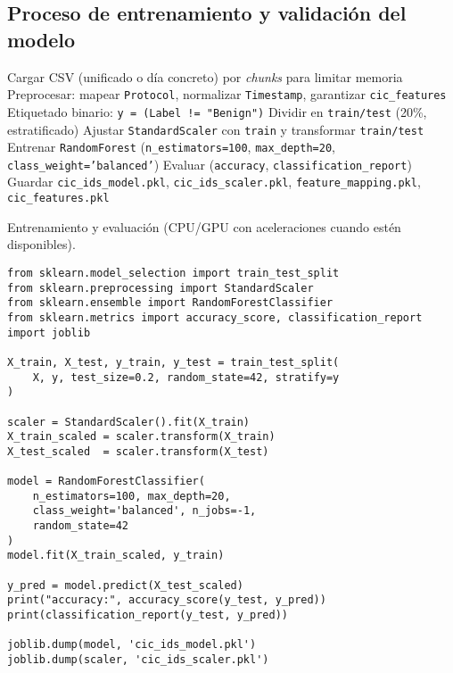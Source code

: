 \subsection{Proceso de entrenamiento y validación del modelo}
\begin{algorithm}[H]
\SetAlgoLined
{}
Cargar CSV (unificado o día concreto) por \textit{chunks} para limitar memoria\;
Preprocesar: mapear \texttt{Protocol}, normalizar \texttt{Timestamp}, garantizar \texttt{cic\_features}\;
Etiquetado binario: \texttt{y = (Label != "Benign")}\;
Dividir en \texttt{train/test} (20\%, estratificado)\;
Ajustar \texttt{StandardScaler} con \texttt{train} y transformar \texttt{train/test}\;
Entrenar \texttt{RandomForest} (\texttt{n\_estimators=100}, \texttt{max\_depth=20}, \texttt{class\_weight='balanced'})\;
Evaluar (\texttt{accuracy}, \texttt{classification\_report})\;
Guardar \texttt{cic\_ids\_model.pkl}, \texttt{cic\_ids\_scaler.pkl}, \texttt{feature\_mapping.pkl}, \texttt{cic\_features.pkl}\;
\caption{Entrenamiento y evaluación (CPU/GPU con aceleraciones cuando estén disponibles).}
\label{alg:train}
\end{algorithm}

\begin{lstlisting}[style=tfgpython,caption={Entrenamiento optimizado (extracto)},label=List.Trainer]
from sklearn.model_selection import train_test_split
from sklearn.preprocessing import StandardScaler
from sklearn.ensemble import RandomForestClassifier
from sklearn.metrics import accuracy_score, classification_report
import joblib

X_train, X_test, y_train, y_test = train_test_split(
    X, y, test_size=0.2, random_state=42, stratify=y
)

scaler = StandardScaler().fit(X_train)
X_train_scaled = scaler.transform(X_train)
X_test_scaled  = scaler.transform(X_test)

model = RandomForestClassifier(
    n_estimators=100, max_depth=20,
    class_weight='balanced', n_jobs=-1,
    random_state=42
)
model.fit(X_train_scaled, y_train)

y_pred = model.predict(X_test_scaled)
print("accuracy:", accuracy_score(y_test, y_pred))
print(classification_report(y_test, y_pred))

joblib.dump(model, 'cic_ids_model.pkl')
joblib.dump(scaler, 'cic_ids_scaler.pkl')
\end{lstlisting}


